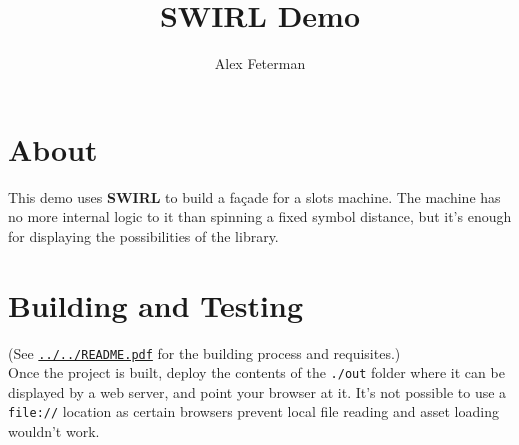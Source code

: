 \documentclass[11pt]{article}
\author{Alex Feterman}
\title{SWIRL Demo}
\newcommand{\link}[2]{\textcolor{darkteal}{\href{#1}{#2}}}
\newcommand{\filepath}[1]{\colorbox{superlightyellow}{\texttt{#1}}}
\begin{document}
\section*{About}
This demo uses \textbf{SWIRL} to build a fa\c{c}ade for a slots machine. The machine has no more
internal logic to it than spinning a fixed symbol distance, but it's enough for
displaying the possibilities of the library.

\section*{Building and Testing}
(See \filepath{\link{file://../../README.pdf}{../../README.pdf}} for the building process and requisites.)\\

Once the project is built, deploy the contents of the \texttt{./out} folder where it
can be displayed by a web server, and point your browser at it. It's not possible
to use a \texttt{file://} location as certain browsers prevent local file reading and
asset loading wouldn't work.
\end{document}
